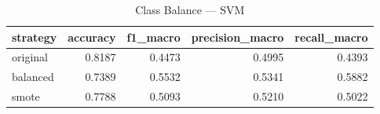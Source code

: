 \begin{table}
\caption{Class Balance — SVM}
\begin{tabular}{lrrrr}
\toprule
strategy & accuracy & f1_macro & precision_macro & recall_macro \\
\midrule
original & 0.8187 & 0.4473 & 0.4995 & 0.4393 \\
balanced & 0.7389 & 0.5532 & 0.5341 & 0.5882 \\
smote & 0.7788 & 0.5093 & 0.5210 & 0.5022 \\
\bottomrule
\end{tabular}
\end{table}
